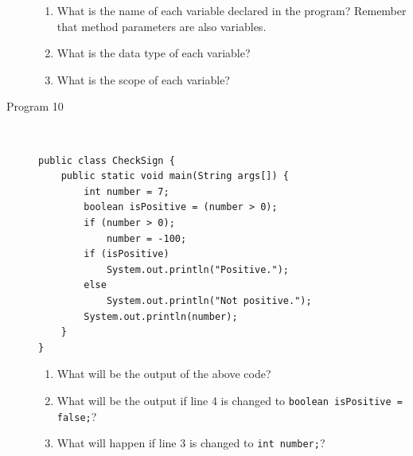 \documentclass[11pt,a4paper]{article}
\def\AnswerBox{\fbox{\begin{minipage}{4in}\hfill\vspace{0.5in}\end{minipage}}}
\begin{document}
\begin{description}
\AnswerBox

\begin{enumerate}[label=\bfseries Q\arabic*:]\itemsep10pt
\item What is the name of each variable declared in the program? Remember that method parameters are also variables.
\item What is the data type of each variable?
\item What is the scope of each variable?
\end{enumerate}

\item [Program 10]\
\begin{lstlisting}
public class CheckSign {
    public static void main(String args[]) {
        int number = 7;
        boolean isPositive = (number > 0);
        if (number > 0);
            number = -100;
        if (isPositive)
            System.out.println("Positive.");
        else
            System.out.println("Not positive.");
        System.out.println(number);
    }
}
\end{lstlisting}

\AnswerBox

\begin{enumerate}[label=\bfseries Q\arabic*:]\itemsep10pt
\item What will be the output of the above code?
\item What will be the output if line 4 is changed to \texttt{boolean isPositive = false;}?
\item What will happen if line 3 is changed to \texttt{int number;}? 
\end{enumerate}
\end{description}
\end{document}
